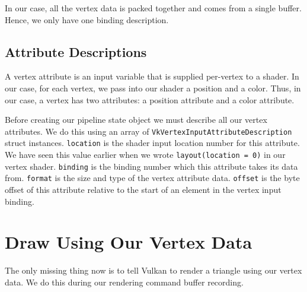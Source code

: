 In our case, all the vertex data is packed together and comes from a single buffer.
Hence, we only have one binding description.

\begin{minipage}{\linewidth}{\noindent}
    
\end{minipage}

\subsection{Attribute Descriptions}

A vertex attribute is an input variable that is supplied per-vertex to a shader.
In our case, for each vertex, we pass into our shader a position and a color.
Thus, in our case, a vertex has two attributes: a position attribute and a
color attribute.

Before creating our pipeline state object we must describe all our
vertex attributes.
We do this using an array of \texttt{VkVertexInputAttributeDescription} struct
instances.
\texttt{location} is the shader input location number for this attribute.
We have seen this value earlier when we wrote \texttt{layout(location = 0)}
in our vertex shader.
\texttt{binding} is the binding number which this attribute takes its data from.
\texttt{format} is the size and type of the vertex attribute data.
\texttt{offset} is the byte offset of this attribute relative to the start of
an element in the vertex input binding.

\begin{minipage}{\linewidth}{\noindent}
    
\end{minipage}

\section{Draw Using Our Vertex Data}

The only missing thing now is to tell Vulkan to render a triangle using our
vertex data.
We do this during our rendering command buffer recording.

\begin{minipage}{\linewidth}{\noindent}
    
\end{minipage}
